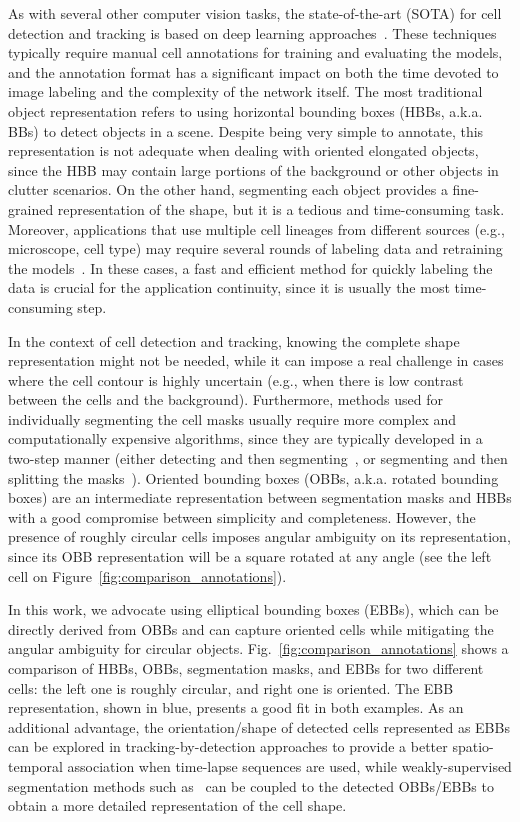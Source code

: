 \documentclass{article}
\begin{document}
As with several other computer vision tasks, the state-of-the-art (SOTA) for cell detection and tracking is based on deep learning approaches~\cite{hayashida2022consistent,emami2021computerized}. These techniques typically require manual cell annotations for training and evaluating the models, and the annotation format has a significant impact on both the time devoted to image labeling and the complexity of the network itself. The most traditional object representation refers to using horizontal bounding boxes (HBBs, a.k.a. BBs) to detect objects in a scene. Despite being very simple to annotate, this representation is not adequate when dealing with oriented elongated objects, since the HBB may contain large portions of the background or other objects in clutter scenarios. On the other hand, segmenting each object provides a fine-grained representation of the shape, but it is a tedious and time-consuming task. Moreover, applications that use multiple cell lineages from different sources (e.g., microscope, cell type) may require several rounds of labeling data and retraining the models~\cite{ulman2017objective}. In these cases, a fast and efficient method for quickly labeling the data is crucial for the application continuity, since it is usually the most time-consuming step.

In the context of cell detection and tracking, knowing the complete shape representation might not be needed, while it can impose a real challenge in cases where the cell contour is highly uncertain (e.g., when there is low contrast between the cells and the background). Furthermore,  methods used for individually segmenting the cell masks usually require more complex and computationally expensive algorithms, since they are typically developed in a two-step manner (either detecting and then segmenting~\cite{cpn,maskrcnn}, or segmenting and then splitting the masks~\cite{bise,unet,gcme,unets,drl}). Oriented bounding boxes (OBBs, a.k.a. rotated bounding boxes) are an intermediate representation between segmentation masks and HBBs with a good compromise between simplicity and completeness. However, the presence of roughly circular cells imposes angular ambiguity on its representation, since its OBB representation will be a square rotated at any angle (see the left cell on Figure~\ref{fig:comparison_annotations}). 

In this work, we advocate using elliptical bounding boxes (EBBs), which can be directly derived from OBBs and can capture oriented cells while mitigating the angular ambiguity for circular objects. Fig.~\ref{fig:comparison_annotations} shows a comparison of HBBs, OBBs, segmentation masks, and EBBs for two different cells: the left one is roughly circular, and right one is oriented. The EBB representation, shown in blue, presents a good fit in both examples. As an additional advantage, the orientation/shape of detected cells represented as EBBs can be explored in tracking-by-detection approaches to provide a better spatio-temporal association when time-lapse sequences are used, while weakly-supervised segmentation methods such as~\cite{kulharia2020box2seg} can be coupled to the detected OBBs/EBBs to obtain a more detailed representation of the cell shape.
\end{document}
